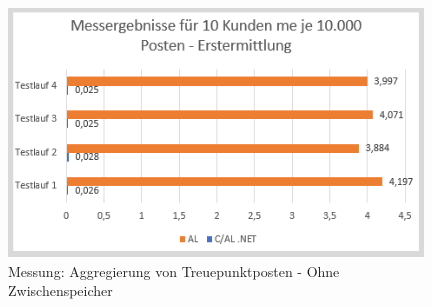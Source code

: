 \begin{figure}[H]
	\centering
	\includegraphics[width=110mm]{images/Test2NoCache}
	\caption{Messung: Aggregierung von Treuepunktposten - Ohne Zwischenspeicher}
	\label{fig:Test2Schema}
\end{figure}


